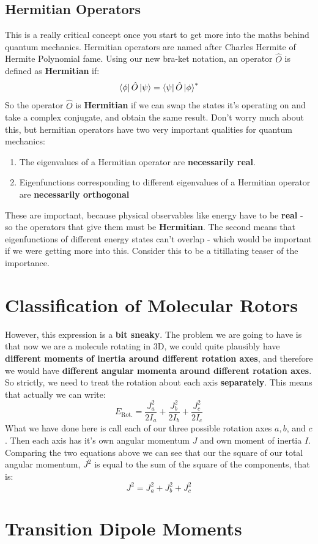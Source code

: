 \documentclass{memoir}[11pt,oneside,a4paper,openany]
\begin{document}
\section{Hermitian Operators}
This is a really critical concept once you start to get more into the maths behind quantum mechanics. Hermitian operators are named after Charles Hermite of Hermite Polynomial fame. Using our new bra-ket notation, an operator $\hat{O}$ is defined as \textbf{Hermitian} if:
\begin{equation}
	\bra{\phi}\hat{O}\ket{\psi} = \bra{\psi}\hat{O}\ket{\phi}^*
\end{equation}
So the operator $\hat{O}$ is \textbf{Hermitian} if we can swap the states it's operating on and take a complex conjugate, and obtain the same result. Don't worry much about this, but hermitian operators have two very important qualities for quantum mechanics:
\begin{enumerate}
	\item The eigenvalues of a Hermitian operator are \textbf{necessarily real}.
	\item Eigenfunctions corresponding to different eigenvalues of a Hermitian operator are \textbf{necessarily orthogonal}
\end{enumerate}
These are important, because physical observables like energy have to be \textbf{real} - so the operators that give them must be \textbf{Hermitian}. The second means that eigenfunctions of different energy states can't overlap - which would be important if we were getting more into this. Consider this to be a titillating teaser of the importance.



\chapter{Classification of Molecular Rotors}
However, this expression is a \textbf{bit sneaky}. The problem we are going to have is that now we are a molecule rotating in 3D, we could quite plausibly have \textbf{different moments of inertia around different rotation axes}, and therefore we would have \textbf{different angular momenta around different rotation axes}. So strictly, we need to treat the rotation about each axis \textbf{separately}. This means that actually we can write:
\begin{equation}
	E_{\text{Rot.}} = \frac{J_a^2}{2I_a} + \frac{J_b^2}{2I_b} + \frac{J_c^2}{2I_c}
\end{equation}
What we have done here is call each of our three possible rotation axes $a, b$, and $c$. Then each axis has it's own angular momentum $J$ and own moment of inertia $I$. Comparing the two equations above we can see that our the square of our total angular momentum, $J^2$ is equal to the sum of the square of the components, that is:
\begin{equation}
	J^2 = J_a^2 + J_b^2 + J_c^2
\end{equation}
\chapter{Transition Dipole Moments}
\end{document}
